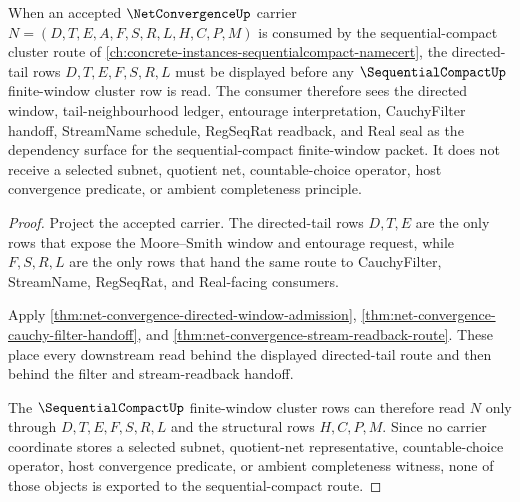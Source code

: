 \begin{theorem}\label{thm:netconvergence-sequentialcompact-dependency}
When an accepted $\NetConvergenceUp$ carrier $N=(D,T,E,A,F,S,R,L,H,C,P,M)$ is consumed by the sequential-compact cluster route of \autoref{ch:concrete-instances-sequentialcompact-namecert}, the directed-tail rows $D,T,E,F,S,R,L$ must be displayed before any $\SequentialCompactUp$ finite-window cluster row is read. The consumer therefore sees the directed window, tail-neighbourhood ledger, entourage interpretation, CauchyFilter handoff, StreamName schedule, RegSeqRat readback, and Real seal as the dependency surface for the sequential-compact finite-window packet. It does not receive a selected subnet, quotient net, countable-choice operator, host convergence predicate, or ambient completeness principle.
\end{theorem}
\begin{proof}
Project the accepted carrier. The directed-tail rows $D,T,E$ are the only rows that expose the Moore--Smith window and entourage request, while $F,S,R,L$ are the only rows that hand the same route to CauchyFilter, StreamName, RegSeqRat, and Real-facing consumers.

Apply \autoref{thm:net-convergence-directed-window-admission}, \autoref{thm:net-convergence-cauchy-filter-handoff}, and \autoref{thm:net-convergence-stream-readback-route}. These place every downstream read behind the displayed directed-tail route and then behind the filter and stream-readback handoff.

The $\SequentialCompactUp$ finite-window cluster rows can therefore read $N$ only through $D,T,E,F,S,R,L$ and the structural rows $H,C,P,M$. Since no carrier coordinate stores a selected subnet, quotient-net representative, countable-choice operator, host convergence predicate, or ambient completeness witness, none of those objects is exported to the sequential-compact route.
\end{proof}


